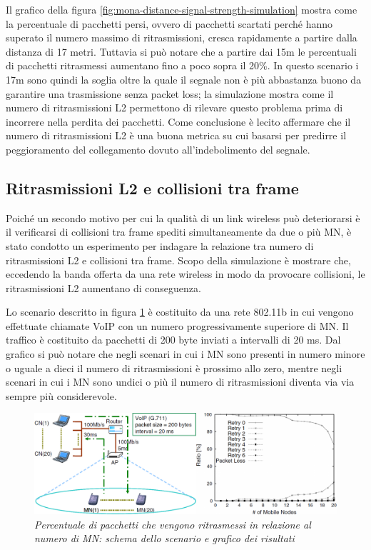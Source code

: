 \documentclass[12pt,a4paper,openright,twoside]{book}
\begin{document}
Il grafico della figura
\ref{fig:mona-distance-signal-strength-simulation} mostra come la
percentuale di pacchetti persi, ovvero di pacchetti scartati perché
hanno superato il numero massimo di ritrasmissioni, cresca rapidamente
a partire dalla distanza di 17 metri. Tuttavia si può notare che a
partire dai 15m le percentuali di pacchetti ritrasmessi aumentano fino
a poco sopra il 20\%. In questo scenario i 17m sono quindi la soglia
oltre la quale il segnale non è più abbastanza buono da garantire una
trasmissione senza packet loss; la simulazione mostra come il numero
di ritrasmissioni L2 permettono di rilevare questo problema prima di
incorrere nella perdita dei pacchetti. Come conclusione è lecito
affermare che il numero di ritrasmissioni L2 è una buona metrica su
cui basarsi per predirre il peggioramento del collegamento dovuto
all'indebolimento del segnale.

\subsection{Ritrasmissioni L2 e collisioni tra frame}

Poiché un secondo motivo per cui la qualità di un link wireless può
deteriorarsi è il verificarsi di collisioni tra frame spediti
simultaneamente da due o più MN, è stato condotto un esperimento per
indagare la relazione tra numero di ritrasmissioni L2 e collisioni tra
frame. Scopo della simulazione è mostrare che, eccedendo la banda
offerta da una rete wireless in modo da provocare collisioni, le
ritrasmissioni L2 aumentano di conseguenza.

Lo scenario descritto in figura \ref{fig:mona-collision-simulation} è
costituito da una rete 802.11b in cui vengono effettuate chiamate VoIP
con un numero progressivamente superiore di MN. Il traffico è
costituito da pacchetti di 200 byte inviati a intervalli di 20 ms. Dal
grafico si può notare che negli scenari in cui i MN sono presenti in
numero minore o uguale a dieci il numero di ritrasmissioni è prossimo
allo zero, mentre negli scenari in cui i MN sono undici o più il
numero di ritrasmissioni diventa via via sempre più considerevole.

\begin{figure}
\centering
\includegraphics[width=\textwidth]{img/mona-collision-simulation}
\caption{\em Percentuale di pacchetti che vengono ritrasmessi in relazione
  al numero di MN: schema dello scenario e grafico dei risultati}
\label{fig:mona-collision-simulation}
\end{figure}
\end{document}
